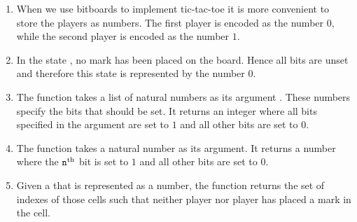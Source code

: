 \begin{enumerate}
\item When we use bitboards to implement tic-tac-toe it is more convenient to store the players as numbers. The
      first player  is encoded as the number $0$, while the second player  is encoded as
      the number $1$. 
\item In the state , no mark has been placed on the board.  Hence all bits are unset and therefore this
      state is represented by the number $0$. 
\item The function  takes a list of natural numbers as its argument .  These numbers specify
      the bits that should be set.  It returns an integer where all bits specified in the argument
       are set to $1$ and all other bits are set to $0$.
\item The function  takes a natural number  as its argument.  It returns a number
      where the $\texttt{n}^\mathrm{th}$ bit is set to $1$ and all other bits are set to $0$.
\item Given a  that is represented as a number, the function  returns the
      set of indexes of those cells such that neither player  nor player  has placed a mark
      in the cell.


\end{enumerate}
